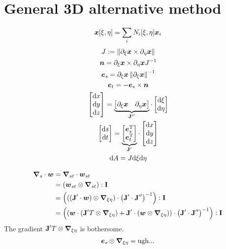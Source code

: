 \documentclass[a4paper,11pt]{article}
\renewcommand{\to}[1]{\text{\boldmath $#1$}} %
\newcommand{\ts}[1]{\text{\boldmath $\mathrm{#1}$}} %
\newcommand{\intd}[1]{\mathrm{d}#1}
\newcommand{\pderiv}[2]{\partial_{#2} #1}
\newcommand{\norm}[1]{\left\lVert{#1}\right\rVert}
\newcommand{\T}{\mathrm{T}}
\newcommand{\defeq}{:=}
\begin{document}
\section{General 3D alternative method}
\begin{align}
 \to x[\xi,\eta] = \sum_i N_i[\xi,\eta]\to x_i
\end{align}
\begin{gather}
 J \defeq \norm{\pderiv{\to x}{\xi} \times  \pderiv{\to x}{\eta}}\\
 \to n = \pderiv{\to x}{\xi} \times \pderiv{\to x}{\eta} J^{-1}\\
 \to e_s = \pderiv{\to x}{\xi}\norm{\pderiv{\to x}{\xi}}^{-1}\\
 \to e_t = -\to e_s\times \to n\\
 \begin{bmatrix}\intd x\\ \intd y\\ \intd z\end{bmatrix} =
  \underbrace{\begin{bmatrix}\pderiv{\to x}{\xi} & \pderiv{\to x}{\eta}
  \end{bmatrix}}_{\ts J''}
  \cdot \begin{bmatrix}\intd \xi \\ \intd \eta\end{bmatrix}\\
 \begin{bmatrix}\intd s\\ \intd t\end{bmatrix} =
  \underbrace{\begin{bmatrix} \to e_s^\T \\ \to e_t^\T
  \end{bmatrix}}_{\ts J'}
  \cdot \begin{bmatrix}\intd x \\ \intd y \\ \intd z\end{bmatrix}\\
 \intd A = J \intd \xi \intd \eta
\end{gather}

\begin{align}
 \to\nabla_s\cdot\to w &= \to\nabla_{st}\cdot\to w_{st} \\
 &= (\to w_{st}\otimes\to\nabla_{st}):\ts I \\
 &= \left(((\ts J'\cdot \to w) \otimes \to\nabla_{\xi\eta})\cdot \left(\ts J'\cdot\ts J''\right)^{-1}\right): \ts I\\
 &= \left((\to w\cdot (\ts J'^\T \otimes \to\nabla_{\xi\eta}) +\ts J'\cdot(\to w\otimes\to\nabla_{\xi\eta}) )\cdot \left(\ts J'\cdot\ts J''\right)^{-1}\right): \ts I
\end{align}
The gradient $\ts J'^\T \otimes\to\nabla_{\xi\eta}$ is bothersome.
\begin{align}
 \to e_s \otimes \to\nabla_{\xi\eta} = \text{ugh...}
\end{align}
\end{document}
